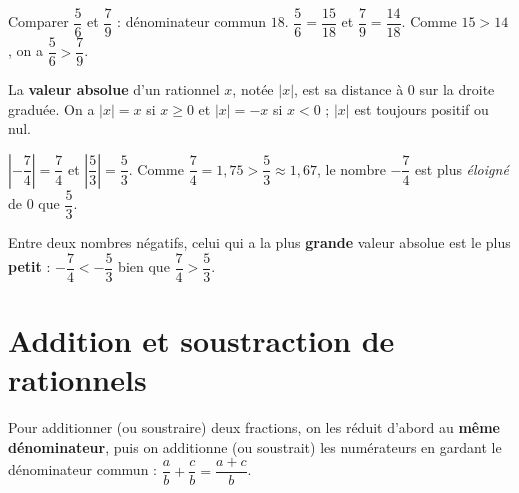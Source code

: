 \begin{exemple}
Comparer $\dfrac56$ et $\dfrac79$ : dénominateur commun $18$. $\dfrac56=\dfrac{15}{18}$ et
$\dfrac79=\dfrac{14}{18}$. Comme $15>14$, on a $\dfrac56>\dfrac79$.
\end{exemple}

\begin{illus}
\end{illus}

\begin{definition}
La \textbf{valeur absolue} d'un rationnel $x$, notée $|x|$, est sa distance à $0$ sur la
droite graduée. On a $|x|=x$ si $x\ge0$ et $|x|=-x$ si $x<0$ ; $|x|$ est toujours positif ou
nul.
\end{definition}

\begin{exemple}
$\left|-\dfrac74\right|=\dfrac74$ et $\left|\dfrac53\right|=\dfrac53$. Comme
$\dfrac74=1{,}75>\dfrac53\approx1{,}67$, le nombre $-\dfrac74$ est plus \emph{éloigné} de $0$
que $\dfrac53$.
\end{exemple}

\begin{remarque}
Entre deux nombres négatifs, celui qui a la plus \textbf{grande} valeur absolue est le plus
\textbf{petit} : $-\dfrac74<-\dfrac53$ bien que $\dfrac74>\dfrac53$.
\end{remarque}

\section{Addition et soustraction de rationnels}

\begin{propriete}
Pour additionner (ou soustraire) deux fractions, on les réduit d'abord au \textbf{même
dénominateur}, puis on additionne (ou soustrait) les numérateurs en gardant le dénominateur
commun : $\dfrac ab+\dfrac cb=\dfrac{a+c}b$.
\end{propriete}

